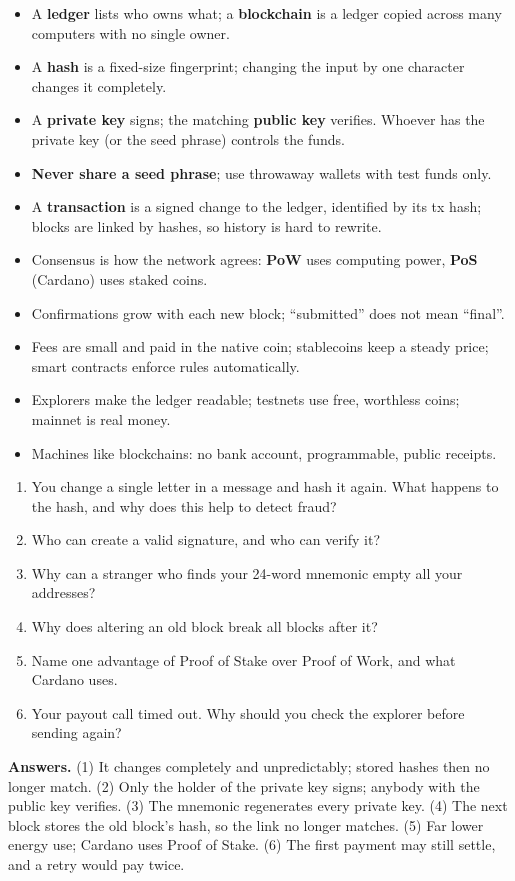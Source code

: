 \begin{keypoints}
\begin{itemize}
  \item A \textbf{ledger} lists who owns what; a \textbf{blockchain} is a ledger copied across many computers with no single owner.
  \item A \textbf{hash} is a fixed-size fingerprint; changing the input by one character changes it completely.
  \item A \textbf{private key} signs; the matching \textbf{public key} verifies. Whoever has the private key (or the seed phrase) controls the funds.
  \item \textbf{Never share a seed phrase}; use throwaway wallets with test funds only.
  \item A \textbf{transaction} is a signed change to the ledger, identified by its tx hash; blocks are linked by hashes, so history is hard to rewrite.
  \item Consensus is how the network agrees: \textbf{PoW} uses computing power, \textbf{PoS} (Cardano) uses staked coins.
  \item Confirmations grow with each new block; ``submitted'' does not mean ``final''.
  \item Fees are small and paid in the native coin; stablecoins keep a steady price; smart contracts enforce rules automatically.
  \item Explorers make the ledger readable; testnets use free, worthless coins; mainnet is real money.
  \item Machines like blockchains: no bank account, programmable, public receipts.
\end{itemize}
\end{keypoints}

\begin{quizbox}
\begin{enumerate}
  \item You change a single letter in a message and hash it again. What happens to the hash, and why does this help to detect fraud?
  \item Who can create a valid signature, and who can verify it?
  \item Why can a stranger who finds your 24-word mnemonic empty all your addresses?
  \item Why does altering an old block break all blocks after it?
  \item Name one advantage of Proof of Stake over Proof of Work, and what Cardano uses.
  \item Your payout call timed out. Why should you check the explorer before sending again?
\end{enumerate}
{\footnotesize\color{cGrey}\textbf{Answers.} (1) It changes completely and unpredictably; stored hashes then no longer match. (2) Only the holder of the private key signs; anybody with the public key verifies. (3) The mnemonic regenerates every private key. (4) The next block stores the old block's hash, so the link no longer matches. (5) Far lower energy use; Cardano uses Proof of Stake. (6) The first payment may still settle, and a retry would pay twice.}
\end{quizbox}
